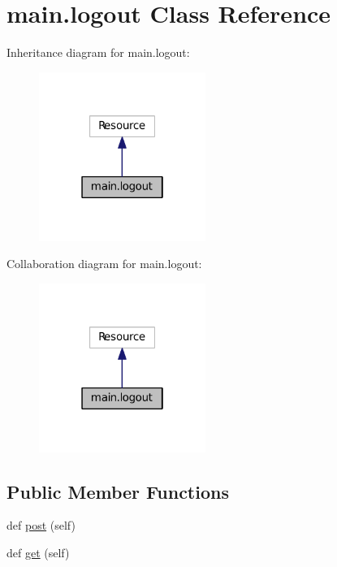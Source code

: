 \hypertarget{classmain_1_1logout}{}\section{main.\+logout Class Reference}
\label{classmain_1_1logout}


Inheritance diagram for main.\+logout\+:\nopagebreak
\begin{figure}[H]
\begin{center}
\leavevmode
\includegraphics[width=154pt]{classmain_1_1logout__inherit__graph}
\end{center}
\end{figure}


Collaboration diagram for main.\+logout\+:\nopagebreak
\begin{figure}[H]
\begin{center}
\leavevmode
\includegraphics[width=154pt]{classmain_1_1logout__coll__graph}
\end{center}
\end{figure}
\subsection*{Public Member Functions}
\begin{DoxyCompactItemize}
\item 
def \hyperlink{classmain_1_1logout_a726ef779e6bf4da8974eae3209276922}{post} (self)
\item 
def \hyperlink{classmain_1_1logout_a014267caa3d9cc9e42fdb71ef54ce43b}{get} (self)
\end{DoxyCompactItemize}


